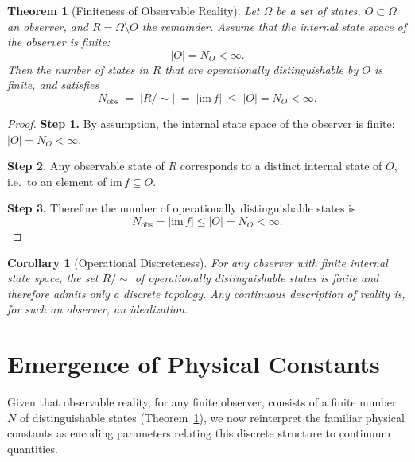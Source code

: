 \documentclass[12pt, a4paper]{article}
\newtheorem{theorem}{Theorem}
\newtheorem{corollary}{Corollary}
\begin{document}
\begin{theorem}[Finiteness of Observable Reality]\label{thm:finiteness}
Let $\Omega$ be a set of states, $O \subset \Omega$ an observer, and $R = \Omega \setminus O$ the remainder. Assume that the internal state space of the observer is finite:
\begin{equation}
    |O| = N_O < \infty.
\end{equation}
Then the number of states in $R$ that are operationally distinguishable by $O$ is finite, and satisfies
\begin{equation}
    N_{\text{obs}} \;=\; |R/\!\sim| \;=\; |\mathrm{im}\,f| \;\le\; |O| = N_O < \infty.
\end{equation}
\end{theorem}

\begin{proof}
\textbf{Step 1.} By assumption, the internal state space of the observer is finite: $|O| = N_O < \infty$.

\textbf{Step 2.} Any observable state of $R$ corresponds to a distinct internal state of $O$, i.e.\ to an element of $\mathrm{im}\,f \subseteq O$.

\textbf{Step 3.} Therefore the number of operationally distinguishable states is
\begin{equation}
    N_{\text{obs}} = |\mathrm{im}\,f| \le |O| = N_O < \infty.
\end{equation}
\end{proof}

\begin{corollary}[Operational Discreteness]\label{cor:discrete}
For any observer with finite internal state space, the set $R/\!\sim$ of operationally distinguishable states is finite and therefore admits only a discrete topology. Any continuous description of reality is, for such an observer, an idealization.
\end{corollary}


\section{Emergence of Physical Constants}

Given that observable reality, for any finite observer, consists of a finite number $N$ of distinguishable states (Theorem~\ref{thm:finiteness}), we now reinterpret the familiar physical constants as encoding parameters relating this discrete structure to continuum quantities.
\end{document}
